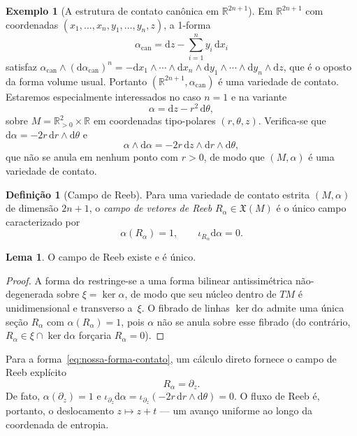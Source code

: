 \documentclass[12pt,a4paper,twoside]{book}
\theoremstyle{plain}
\theoremstyle{definition}
\newtheorem{lema}[teorema]{Lema}
\theoremstyle{definition}
\newtheorem{definicao}[teorema]{Definição}
\newtheorem{exemplo}[teorema]{Exemplo}
\newcommand{\R}{\mathbb{R}}
\newcommand{\Reeb}{R_\alpha}
\newcommand{\dd}{\mathrm{d}}
\begin{document}
\begin{exemplo}[A estrutura de contato canônica em $\R^{2n+1}$]
\label{ex:contato-canonica}
Em $\R^{2n+1}$ com coordenadas $(x_{1},\dots,x_{n},y_{1},\dots,y_{n},z)$,
a 1-forma
\[
  \alpha_{\mathrm{can}} = \dd z - \sum_{i=1}^{n} y_{i}\,\dd x_{i}
\]
satisfaz
$\alpha_{\mathrm{can}} \wedge (\dd\alpha_{\mathrm{can}})^{n} =
 -\dd x_{1} \wedge \cdots \wedge \dd x_{n} \wedge \dd y_{1} \wedge \cdots
 \wedge \dd y_{n} \wedge \dd z$,
que é o oposto da forma volume usual. Portanto
$(\R^{2n+1},\alpha_{\mathrm{can}})$ é uma variedade de contato.
Estaremos especialmente interessados no caso $n=1$ e na variante
\begin{equation}\label{eq:nossa-forma-contato}
  \alpha = \dd z - r^{2}\,\dd\theta,
\end{equation}
sobre $M = \R^{2}_{>0} \times \R$ em coordenadas tipo-polares $(r,\theta,z)$.
Verifica-se que $\dd\alpha = -2r\,\dd r \wedge \dd\theta$ e
\[
  \alpha \wedge \dd\alpha = -2r\,\dd z \wedge \dd r \wedge \dd\theta,
\]
que não se anula em nenhum ponto com $r>0$, de modo que $(M,\alpha)$ é
uma variedade de contato.
\end{exemplo}

\begin{definicao}[Campo de Reeb]\label{def:reeb}
Para uma variedade de contato estrita $(M,\alpha)$ de dimensão $2n+1$,
o \emph{campo de vetores de Reeb} $\Reeb \in \mathfrak{X}(M)$ é o único
campo caracterizado por
\begin{equation}\label{eq:reeb-defn}
  \alpha(\Reeb) = 1, \qquad \iota_{\Reeb}\dd\alpha = 0.
\end{equation}
\end{definicao}

\begin{lema}\label{lem:reeb-existe}
O campo de Reeb existe e é único.
\end{lema}
\begin{proof}
A forma $\dd\alpha$ restringe-se a uma forma bilinear antissimétrica
não-degenerada sobre $\xi=\ker\alpha$, de modo que seu núcleo dentro de
$TM$ é unidimensional e transverso a~$\xi$. O fibrado de linhas
$\ker\dd\alpha$ admite uma única seção $\Reeb$ com $\alpha(\Reeb)=1$,
pois $\alpha$ não se anula sobre esse fibrado (do contrário,
$\Reeb \in \xi \cap \ker\dd\alpha$ forçaria $\Reeb=0$).
\end{proof}

Para a forma~\eqref{eq:nossa-forma-contato}, um cálculo direto fornece
o campo de Reeb explícito
\begin{equation}\label{eq:reeb-explicito}
  \Reeb = \partial_{z}.
\end{equation}
De fato, $\alpha(\partial_z) = 1$ e
$\iota_{\partial_z}\dd\alpha = \iota_{\partial_z}(-2r\,\dd r \wedge \dd\theta)
 = 0$. O fluxo de Reeb é, portanto, o deslocamento $z \mapsto z + t$ ---
um avanço uniforme ao longo da coordenada de entropia.
\end{document}
